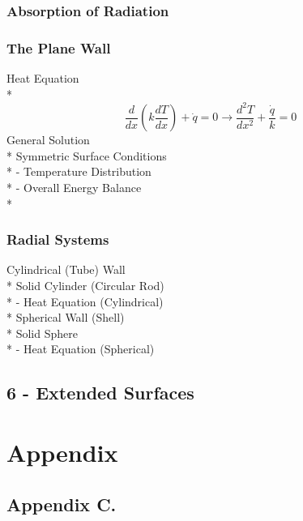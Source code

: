 \documentclass[10pt,landscape]{article}
\begin{document}
\begin{multicols}{3}
\subsubsection{Absorption of Radiation}
\subsubsection{The Plane Wall}
Heat Equation\\*
\begin{equation}
    \frac{d}{dx}(k\frac{dT}{dx})+\dot{q}=0\rightarrow\frac{d^2T}{dx^2}+\frac{\dot{q}}{k}=0
\end{equation}
General Solution\\*
Symmetric Surface Conditions\\*
- Temperature Distribution\\*
- Overall Energy Balance\\*
\subsubsection{Radial Systems}
Cylindrical (Tube) Wall\\*
Solid Cylinder (Circular Rod)\\*
- Heat Equation (Cylindrical)\\*
Spherical Wall (Shell)\\*
Solid Sphere\\*
- Heat Equation (Spherical)\\
\subsection{6 - Extended Surfaces}


\section{Appendix}
\subsection{Appendix C.}



\end{multicols}
\end{document}
